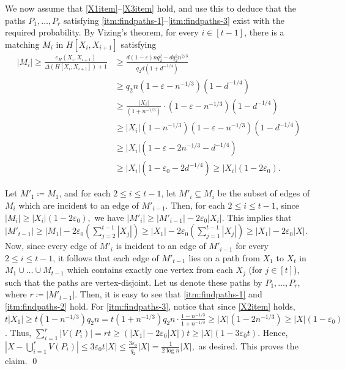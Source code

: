 \documentclass[10pt]{article}
\theoremstyle{plain}
\numberwithin{theorem}{section}
\theoremstyle{definition}
\theoremstyle{remark}
\renewenvironment{proof}[1][]{\begin{trivlist}
\item[\hspace{\labelsep}{\bf\noindent Proof#1.\/}] }{\qed\end{trivlist}}
\renewcommand{\setminus}{-}
\newcommand{\eps}{\varepsilon}
\theoremstyle{plain}
\begin{document}
\begin{proof}[ of claim]
		We now assume that \ref{X1item}--\ref{X3item} hold, and use this to deduce that the paths $P_1, \ldots, P_r$ satisfying \ref{itm:findpaths-1}--\ref{itm:findpaths-3} exist with the required probability.
		By Vizing's theorem, for every $i \in [t-1]$, there is a matching $M_i$ in $H[X_i, X_{i+1}]$ satisfying
		\begin{align*}
			|M_i| 
			\ge \frac{e_H(X_i, X_{i+1})}{\Delta(H[X_i, X_{i+1}])+1} 
			& \ge \frac{d(1 - \eps)n q_2^2 - d q_2^2 n^{2/3}}{q_2 d(1+d^{-1/4})} \\[.5em]
			& \ge q_2n(1 - \eps-n^{-1/3})(1-d^{-1/4}) \\[.5em]
			& \ge \frac{|X_i|}{(1 + n^{-1/3})} \cdot (1 - \eps-n^{-1/3})(1-d^{-1/4}) \\[.5em]
			& \ge |X_i|(1 - n^{-1/3})(1 - \eps - n^{-1/3})(1 - d^{-1/4}) \\
			& \ge |X_i|(1 - \eps - 2n^{-1/3} - d^{-1/4}) \\
			& \ge |X_i|(1 - \eps_0 - 2d^{-1/4}) 
			\ge |X_i|(1 - 2\eps_0).
		\end{align*}

		Let $M'_1 \coloneqq M_1$, and for each $2 \le i \le t-1$, let $M'_i \subseteq M_i$ be the subset of edges of $M_i$ which are incident to an edge of $M'_{i-1}$. Then, for each $2 \le i \le t-1$, since $|M_i| \ge |X_i|(1 - 2\eps_0),$ we have $|M'_i| \ge |M'_{i-1}|-2\eps_0 |X_{i}|$. This implies that $|M'_{t-1}| \ge |M_{1}|-2\eps_0 (\sum_{j=2}^{t-1}|X_{j}|) \ge |X_{1}|-2\eps_0 (\sum_{j=1}^{t-1}|X_{j}|) \ge |X_{1}|-2\eps_0 |X|$. Now, since every edge of $M'_{i}$ is incident to an edge of $M'_{i-1}$ for every $2 \le i \le t-1$, it follows that each edge of $M'_{t-1}$ lies on a path from $X_1$ to $X_t$ in $M_1 \cup \ldots \cup M_{t-1}$ which contains exactly one vertex from each $X_j$ (for $j \in [t]$), such that the paths are vertex-disjoint. Let us denote these paths by $P_1, \ldots, P_r$, where $r \coloneqq |M'_{t-1}|$. Then, it is easy to see that \ref{itm:findpaths-1} and \ref{itm:findpaths-2} hold.
		For \ref{itm:findpaths-3}, notice that since \ref{X2item} holds, $t|X_1| \ge t(1 - n^{-1/3})q_2n = t(1 + n^{-1/3})q_2n \cdot \frac{1 - n^{-1/3}}{1 + n^{-1/3}} \ge |X|(1 - 2n^{-1/3}) \ge |X|(1 - \eps_0)$.
		Thus, $\sum_{i = 1}^r|V(P_i)| = rt \ge (|X_{1}|-2\eps_0 |X|)t \ge |X|(1 - 3 \eps_0 t)$. Hence, $|X \setminus \bigcup_{i = 1 }^r V(P_i)| \le 3 \eps_0 t |X| \le \frac{3 \eps_0}{q_2} |X| = \frac{1}{2\log n} |X|,$ as desired. This proves the claim.
	\end{proof}
\end{document}
